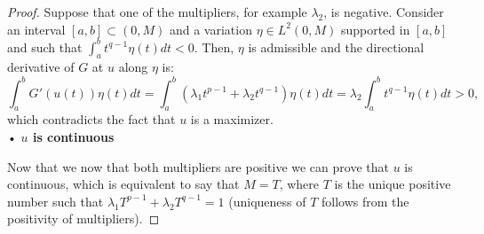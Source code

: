 \documentclass[corpo=11pt, stile=classica, tipotesi=custom,
greek, evenboxes, english]{toptesi}
\numberwithin{equation}{chapter}
\theoremstyle{definition}
\theoremstyle{remark}
\begin{document}
\begin{proof}
Suppose that one of the multipliers, for example $\lambda_2$, is negative. Consider an interval $[a,b] \subset (0,M)$ and a variation $\eta \in L^2(0,M)$ supported in $[a,b]$ and such that $\int_{a}^{b}t^{q-1}\eta(t)dt <0$. Then, $\eta$ is admissible and the directional derivative of $G$ at $u$ along $\eta$ is:
\begin{equation*}
	\int_{a}^{b} G'(u(t))\eta(t)dt = \int_{a}^{b} (\lambda_1 t^{p-1} + \lambda_2 t^{q-1})\eta(t)dt = \lambda_2 \int_{a}^{b} t^{q-1} \eta(t)dt > 0,
\end{equation*}
which contradicts the fact that $u$ is a maximizer.\\
• \textbf{$u$ is continuous}

Now that we now that both multipliers are positive we can prove that $u$ is continuous, which is equivalent to say that $M=T$, where $T$ is the unique positive number such that $\lambda_1 T^{p-1} + \lambda_2 T^{q-1} = 1$ (uniqueness of $T$ follows from the positivity of multipliers).


\end{proof}
\end{document}
